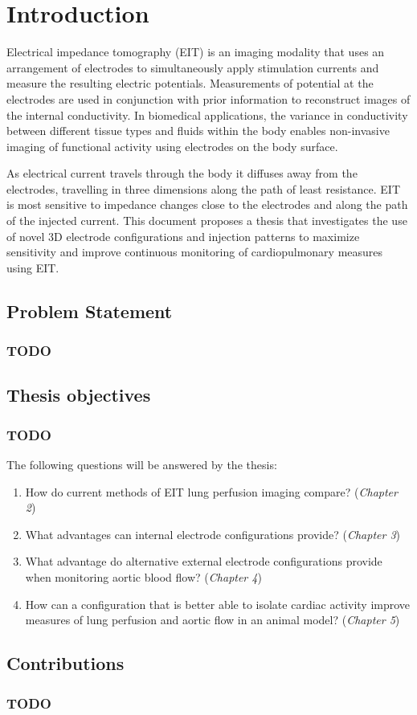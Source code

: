 \chapter{Introduction}

Electrical impedance tomography (EIT) is an imaging modality that uses an arrangement of electrodes to simultaneously apply 
stimulation currents and measure 
the resulting electric potentials. Measurements of potential at the electrodes are used in conjunction with 
prior information to reconstruct images 
of the internal conductivity. In biomedical applications, the variance in conductivity between different 
tissue types and fluids within the body enables non-invasive imaging of functional activity using electrodes on the 
body surface.

As electrical current travels through the body it diffuses away from the electrodes,
travelling in three dimensions along the path of least resistance. 
EIT is most sensitive to impedance changes close to the electrodes 
and along the path of the injected current.
This document proposes a thesis that investigates the use of novel 3D electrode 
configurations and injection patterns to maximize sensitivity and improve continuous monitoring 
of cardiopulmonary measures using EIT.

\section{Problem Statement}
\subsection{TODO}

\section{Thesis objectives}
\subsection{TODO}
The following questions will be answered by the thesis:
\begin{enumerate}
	\item How do current methods of EIT lung perfusion imaging compare? (\emph{Chapter 2})
	\item What advantages can internal electrode configurations provide? (\emph{Chapter 3})
\item What advantage do alternative external electrode configurations provide
	when monitoring aortic blood flow? (\emph{Chapter 4})
\item How can a configuration that is better able to isolate cardiac activity
	improve measures of lung perfusion and aortic flow in an animal model? (\emph{Chapter 5})
\end{enumerate}

\section{Contributions}
\subsection{TODO}